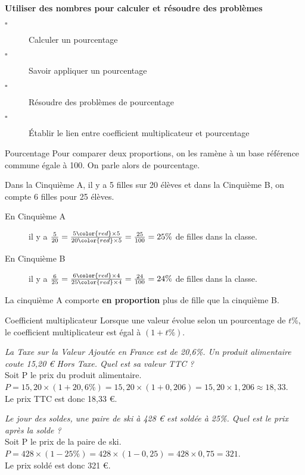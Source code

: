 \begin{titre}[La proportionnalité]

\end{titre}

\begin{CpsCol}
\textbf{Utiliser des nombres pour calculer et résoudre des problèmes}
\begin{description}
\item[$\square$] Calculer un pourcentage
\item[$\square$] Savoir appliquer un pourcentage
\item[$\square$] Résoudre des problèmes de pourcentage
\item[$\square$] Établir le lien entre coefficient multiplicateur et pourcentage
\end{description}
\end{CpsCol}



\begin{DefT}{Pourcentage}
Pour comparer deux proportions, on les ramène à un base référence commune égale à 100. On parle alors de  pourcentage.
\end{DefT}

\begin{Ex}
Dans la Cinquième A, il y a 5 filles sur 20 élèves et dans la Cinquième B, on compte 6 filles pour 25 élèves.
\begin{description}
\item[En Cinquième A] il y a $\frac{5}{20}=\frac{5 {\color{red}\times 5} }{20 {\color{red}\times 5}} = \frac{25}{100} = 25\%$ de filles dans la classe.
\item[En Cinquième B] il y a $\frac{6}{25}=\frac{6 {\color{red}\times 4} }{25 {\color{red}\times 4}} = \frac{24}{100} = 24\%$ de filles dans la classe.
\end{description}
La cinquième A comporte \textbf{en proportion} plus de fille que la cinquième B.
\end{Ex}



\begin{DefT}{Coefficient multiplicateur}
Lorsque une valeur évolue selon un pourcentage de $t \%$, le coefficient multiplicateur est égal à $(1+t\%)$.
\end{DefT}


\begin{Ex}
\textit{La Taxe sur la Valeur Ajoutée en France est de 20,6\%. Un produit alimentaire coute 15,20 € Hors Taxe. Quel est sa valeur TTC ?}\\
Soit P le prix du produit alimentaire.\\
$P = 15,20 \times (1+20,6\%)= 15,20 \times (1+0,206) = 15,20 \times 1,206 \approx 18,33$.\\
Le prix TTC est donc 18,33 €.
\end{Ex}

\begin{Ex}
\textit{Le jour des soldes, une paire de ski à 428 € est soldée à 25\%. Quel est le prix après la solde ? }\\
Soit P le prix de la paire de ski.\\
$P = 428 \times (1-25\%)= 428 \times (1-0,25) = 428 \times 0,75 =321 $.\\
Le prix soldé est donc 321 €.
\end{Ex}